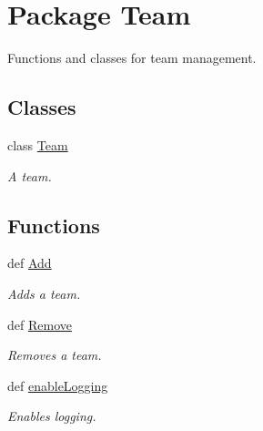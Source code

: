 \hypertarget{namespace_team}{
\section{Package Team}
\label{namespace_team}
}


Functions and classes for team management.  


\subsection*{Classes}
\begin{DoxyCompactItemize}
\item 
class \hyperlink{class_team_1_1_team}{Team}
\begin{DoxyCompactList}\small\item\em A team. \item\end{DoxyCompactList}\end{DoxyCompactItemize}
\subsection*{Functions}
\begin{DoxyCompactItemize}
\item 
def \hyperlink{namespace_team_ae156f7420c5c0c650a78e5eea3880645}{Add}
\begin{DoxyCompactList}\small\item\em Adds a team. \item\end{DoxyCompactList}\item 
def \hyperlink{namespace_team_aad0c17f9553c3ed62fc6216b1e6c9869}{Remove}
\begin{DoxyCompactList}\small\item\em Removes a team. \item\end{DoxyCompactList}\item 
def \hyperlink{namespace_team_a391de1d02502546ec5d88de1632b3bc2}{enableLogging}
\begin{DoxyCompactList}\small\item\em Enables logging. \item\end{DoxyCompactList}\end{DoxyCompactItemize}
